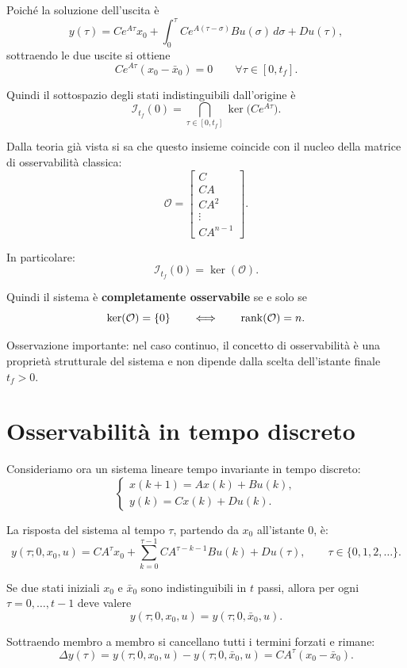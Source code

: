 Poiché la soluzione dell'uscita è
\[
y(\tau)=Ce^{A\tau}x_0+\int_0^\tau Ce^{A(\tau-\sigma)}Bu(\sigma)\,d\sigma + Du(\tau),
\]
sottraendo le due uscite si ottiene
\[
Ce^{A\tau}(x_0-\bar x_0)=0
\qquad
\forall \tau\in[0,t_f].
\]

Quindi il sottospazio degli stati indistinguibili dall'origine è
\[
\mathcal I_{t_f}(0)
=
\bigcap_{\tau\in[0,t_f]} \ker\!\big(Ce^{A\tau}\big).
\]

Dalla teoria già vista si sa che questo insieme coincide con il nucleo della matrice di osservabilità classica:
\[
\mathcal O=
\begin{bmatrix}
C\\
CA\\
CA^2\\
\vdots\\
CA^{n-1}
\end{bmatrix}.
\]

In particolare:
\[
\mathcal I_{t_f}(0)=\ker(\mathcal O).
\]

Quindi il sistema è \textbf{completamente osservabile} se e solo se
\[
\ker(\mathcal O)=\{0\}
\qquad
\Longleftrightarrow
\qquad
\rank(\mathcal O)=n.
\]

\medskip

Osservazione importante: nel caso continuo, il concetto di osservabilità è una proprietà strutturale del sistema e non dipende dalla scelta dell'istante finale \(t_f>0\).

\section{Osservabilità in tempo discreto}

Consideriamo ora un sistema lineare tempo invariante in tempo discreto:
\[
\begin{cases}
x(k+1)=Ax(k)+Bu(k),\\[2mm]
y(k)=Cx(k)+Du(k).
\end{cases}
\]

La risposta del sistema al tempo \(\tau\), partendo da \(x_0\) all'istante \(0\), è:
\[
y(\tau;0,x_0,u)
=
CA^\tau x_0
+
\sum_{k=0}^{\tau-1} CA^{\tau-k-1}Bu(k)
+
Du(\tau),
\qquad \tau\in\{0,1,2,\dots\}.
\]

Se due stati iniziali \(x_0\) e \(\bar x_0\) sono indistinguibili in \(t\) passi, allora per ogni \(\tau=0,\dots,t-1\) deve valere
\[
y(\tau;0,x_0,u)=y(\tau;0,\bar x_0,u).
\]

Sottraendo membro a membro si cancellano tutti i termini forzati e rimane:
\[
\Delta y(\tau)
=
y(\tau;0,x_0,u)-y(\tau;0,\bar x_0,u)
=
CA^\tau (x_0-\bar x_0).
\]

